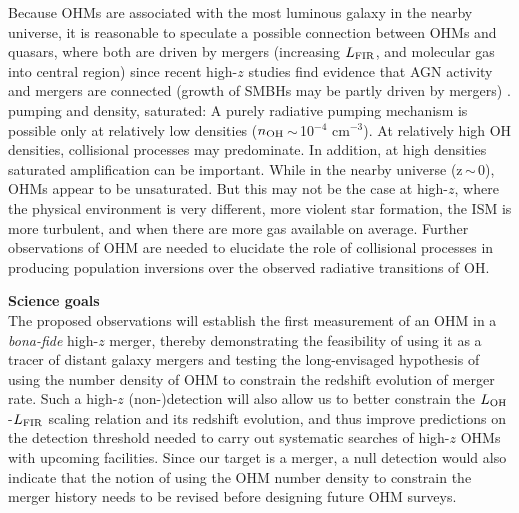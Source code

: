 \documentclass[letterpaper,11pt]{article}
\newcommand{\LFIR}{\mbox{$L_{\rm FIR}$}\xspace}
\newcommand{\LOH}{$L_{\rm OH}$\xspace}
\newcommand{\ssim}{\,$\sim$\,}
\newcommand{\obs}{observations\xspace}
\begin{document}
Because OHMs are associated with the most luminous galaxy in the nearby universe, it is reasonable to speculate a possible connection
between OHMs and quasars, where both are driven by mergers (increasing \LFIR, and molecular gas into central region) 
since recent high-$z$ studies find evidence that AGN activity and mergers are connected (growth of SMBHs may be partly driven by 
mergers) \citep{DiMatteo05a}.
pumping and density, saturated:
 A purely radiative pumping mechanism is possible only at relatively low densities
($n_{\rm OH}$\ssim10$^{-4}$ cm$^{-3}$). At relatively high OH densities, collisional processes may predominate. In addition, at high densities
saturated amplification can be important.
While in the nearby universe (z\ssim0), OHMs appear to be unsaturated. But this may not be the case at high-$z$, where
 the physical environment is very different, more violent star formation, the ISM is more turbulent, and when there are more gas 
 available on average.
Further \obs of OHM are needed to elucidate the role of collisional processes in 
producing population inversions over the observed radiative transitions of OH.


\noindent \textbf{Science goals} \\

\indent The proposed \obs will establish the first measurement of an OHM in a {\it bona-fide} high-$z$ merger, thereby
demonstrating the feasibility of using it as a tracer of distant galaxy mergers and
testing the long-envisaged hypothesis of using the number density of OHM to constrain 
the redshift evolution of merger rate. 
Such a
high-$z$ (non-)detection will also allow us to better constrain the \LOH-\LFIR scaling relation and its redshift evolution,
and thus improve 
predictions on the detection threshold needed  
to carry out systematic searches of high-$z$ OHMs with upcoming facilities.  
Since our target is a merger, 
a null detection would also indicate that the notion of 
using the OHM number density to constrain the merger history needs to be revised before designing future OHM surveys.
\end{document}
